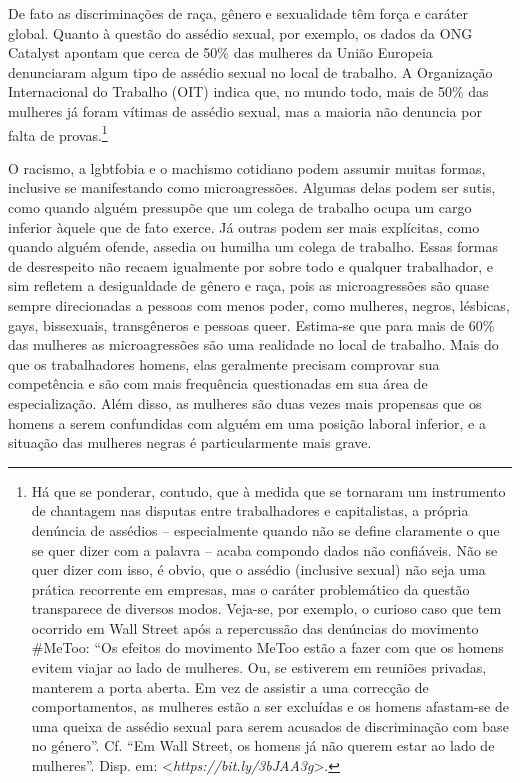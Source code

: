 De fato as discriminações de raça, gênero e sexualidade têm força e
caráter global. Quanto à questão do assédio sexual, por exemplo, os
dados da ONG Catalyst apontam que cerca de 50\% das mulheres da União
Europeia denunciaram algum tipo de assédio sexual no local de trabalho.
A Organização Internacional do Trabalho (OIT) indica que, no mundo todo,
mais de 50\% das mulheres já foram vítimas de assédio sexual, mas a
maioria não denuncia por falta de provas.\footnote{Há que se ponderar,
  contudo, que à medida que se tornaram um instrumento de chantagem nas
  disputas entre trabalhadores e capitalistas, a própria denúncia de
  assédios -- especialmente quando não se define claramente o que se
  quer dizer com a palavra -- acaba compondo dados não confiáveis. Não
  se quer dizer com isso, é obvio, que o assédio (inclusive sexual) não
  seja uma prática recorrente em empresas, mas o caráter problemático da
  questão transparece de diversos modos. Veja-se, por exemplo, o curioso
  caso que tem ocorrido em Wall Street após a repercussão das denúncias
  do movimento \#MeToo: ``Os efeitos do movimento MeToo estão a fazer
  com que os homens evitem viajar ao lado de mulheres. Ou, se estiverem
  em reuniões privadas, manterem a porta aberta. Em vez de assistir a
  uma correcção de comportamentos, as mulheres estão a ser excluídas e
  os homens afastam-se de uma queixa de assédio sexual para serem
  acusados de discriminação com base no género''. Cf. ``Em Wall Street,
  os homens já não querem estar ao lado de mulheres''. Disp. em:
  \textless{}\emph{https://bit.ly/3bJAA3g}\textgreater{}.}

O racismo, a lgbtfobia e o machismo cotidiano podem assumir muitas
formas, inclusive se manifestando como microagressões. Algumas delas
podem ser sutis, como quando alguém pressupõe que um colega de trabalho
ocupa um cargo inferior àquele que de fato exerce. Já outras podem ser
mais explícitas, como quando alguém ofende, assedia ou humilha um colega
de trabalho. Essas formas de desrespeito não recaem igualmente por sobre
todo e qualquer trabalhador, e sim refletem a desigualdade de gênero e
raça, pois as microagressões são quase sempre direcionadas a pessoas com
menos poder, como mulheres, negros, lésbicas, gays, bissexuais,
transgêneros e pessoas queer. Estima-se que para mais de 60\% das
mulheres as microagressões são uma realidade no local de trabalho. Mais
do que os trabalhadores homens, elas geralmente precisam comprovar sua
competência e são com mais frequência questionadas em sua área de
especialização. Além disso, as mulheres são duas vezes mais propensas
que os homens a serem confundidas com alguém em uma posição laboral
inferior, e a situação das mulheres negras é particularmente mais grave.


